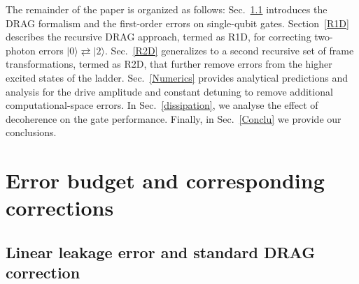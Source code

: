 \documentclass[superscriptaddress,amsmath,amssymb,aps,twocolumn,praplied,notitlepage]{revtex4-2}
\newcommand{\ket}[1]{\vert #1 \rangle}
\begin{document}
The remainder of the paper is organized as follows: Sec.~\ref{DRAG} introduces the DRAG formalism and the first-order errors on single-qubit gates. Section~\ref{R1D} describes the recursive DRAG approach, termed as R1D,  for correcting two-photon errors $\ket{0}\rightleftarrows\ket{2}$. Sec.~\ref{R2D} generalizes to a second recursive set of frame transformations, termed as R2D, that further remove errors from the higher excited states of the ladder. Sec.~\ref{Numerics} provides analytical predictions and analysis for the drive amplitude and constant detuning to remove additional computational-space errors. In Sec.~\ref{dissipation}, we analyse the effect of decoherence on the gate performance. Finally, in Sec.~\ref{Conclu} we provide our conclusions. 


\section{Error budget and corresponding corrections}
\label{analytical section}

\subsection{Linear leakage error and standard DRAG correction}
\label{DRAG}
\end{document}
